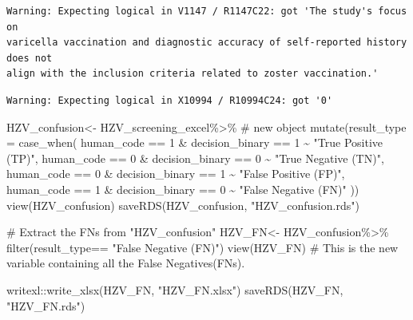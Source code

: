 \documentclass[
  letterpaper,
  DIV=11,
  numbers=noendperiod]{scrartcl}
\newenvironment{Shaded}{\begin{snugshade}}{\end{snugshade}}
\newcommand{\AttributeTok}[1]{\textcolor[rgb]{0.40,0.45,0.13}{#1}}
\newcommand{\CommentTok}[1]{\textcolor[rgb]{0.37,0.37,0.37}{#1}}
\newcommand{\DecValTok}[1]{\textcolor[rgb]{0.68,0.00,0.00}{#1}}
\newcommand{\FunctionTok}[1]{\textcolor[rgb]{0.28,0.35,0.67}{#1}}
\newcommand{\NormalTok}[1]{\textcolor[rgb]{0.00,0.23,0.31}{#1}}
\newcommand{\OtherTok}[1]{\textcolor[rgb]{0.00,0.23,0.31}{#1}}
\newcommand{\SpecialCharTok}[1]{\textcolor[rgb]{0.37,0.37,0.37}{#1}}
\newcommand{\StringTok}[1]{\textcolor[rgb]{0.13,0.47,0.30}{#1}}
\begin{document}
\begin{verbatim}
Warning: Expecting logical in V1147 / R1147C22: got 'The study's focus on
varicella vaccination and diagnostic accuracy of self-reported history does not
align with the inclusion criteria related to zoster vaccination.'
\end{verbatim}

\begin{verbatim}
Warning: Expecting logical in X10994 / R10994C24: got '0'
\end{verbatim}

\begin{Shaded}
\begin{Highlighting}[]
\NormalTok{HZV\_confusion}\OtherTok{\textless{}{-}}\NormalTok{ HZV\_screening\_excel}\SpecialCharTok{\%\textgreater{}\%}  \CommentTok{\# new object}
  \FunctionTok{mutate}\NormalTok{(}\AttributeTok{result\_type =} \FunctionTok{case\_when}\NormalTok{(}
\NormalTok{    human\_code }\SpecialCharTok{==} \DecValTok{1} \SpecialCharTok{\&}\NormalTok{ decision\_binary }\SpecialCharTok{==} \DecValTok{1} \SpecialCharTok{\textasciitilde{}} \StringTok{"True Positive (TP)"}\NormalTok{,}
\NormalTok{    human\_code }\SpecialCharTok{==} \DecValTok{0} \SpecialCharTok{\&}\NormalTok{ decision\_binary }\SpecialCharTok{==} \DecValTok{0} \SpecialCharTok{\textasciitilde{}} \StringTok{"True Negative (TN)"}\NormalTok{,}
\NormalTok{    human\_code }\SpecialCharTok{==} \DecValTok{0} \SpecialCharTok{\&}\NormalTok{ decision\_binary }\SpecialCharTok{==} \DecValTok{1} \SpecialCharTok{\textasciitilde{}} \StringTok{"False Positive (FP)"}\NormalTok{,}
\NormalTok{    human\_code }\SpecialCharTok{==} \DecValTok{1} \SpecialCharTok{\&}\NormalTok{ decision\_binary }\SpecialCharTok{==} \DecValTok{0} \SpecialCharTok{\textasciitilde{}} \StringTok{"False Negative (FN)"}
\NormalTok{  ))}
\FunctionTok{view}\NormalTok{(HZV\_confusion)}
\FunctionTok{saveRDS}\NormalTok{(HZV\_confusion, }\StringTok{"HZV\_confusion.rds"}\NormalTok{)}

\CommentTok{\# Extract the FNs from "HZV\_confusion"}
\NormalTok{HZV\_FN}\OtherTok{\textless{}{-}}\NormalTok{ HZV\_confusion}\SpecialCharTok{\%\textgreater{}\%}
  \FunctionTok{filter}\NormalTok{(result\_type}\SpecialCharTok{==} \StringTok{"False Negative (FN)"}\NormalTok{) }
\FunctionTok{view}\NormalTok{(HZV\_FN)}
\CommentTok{\# This is the new variable containing all the False Negatives(FNs).}

\NormalTok{writexl}\SpecialCharTok{::}\FunctionTok{write\_xlsx}\NormalTok{(HZV\_FN, }\StringTok{"HZV\_FN.xlsx"}\NormalTok{)}
\FunctionTok{saveRDS}\NormalTok{(HZV\_FN, }\StringTok{"HZV\_FN.rds"}\NormalTok{)}
\end{Highlighting}
\end{Shaded}
\end{document}
